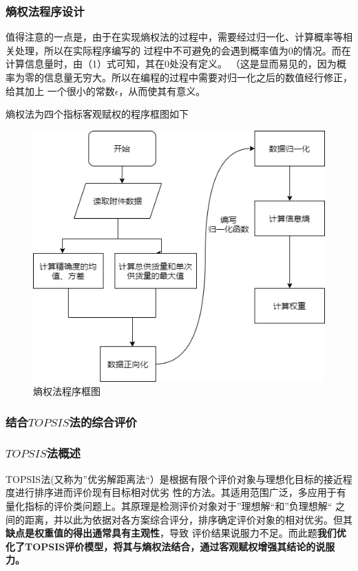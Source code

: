\documentclass{cumcmthesis}
\begin{document}
\subsubsection*{熵权法程序设计}
值得注意的一点是，由于在实现熵权法的过程中，需要经过归一化、计算概率等相关处理，所以在实际程序编写的
过程中不可避免的会遇到概率值为0的情况。而在计算信息量时，由（1）式可知，其在0处没有定义。
（这是显而易见的，因为概率为零的信息量无穷大。所以在编程的过程中需要对归一化之后的数值经行修正，给其加上
一个很小的常数$\epsilon$\cite{黄鹏2015福建省土地生态安全AHP法和熵值法动态评价比较}，从而使其有意义。\par
熵权法为四个指标客观赋权的程序框图如下
\begin{figure}[H]
    \centering
    \includegraphics[scale=0.6]{shangquan.png}
    \caption{熵权法程序框图}     \label{fig:2}
\end{figure}
\subsubsection{结合$TOPSIS$法的综合评价}
\subsubsection*{$TOPSIS$法概述}
TOPSIS法(又称为”优劣解距离法“）是根据有限个评价对象与理想化目标的接近程度进行排序进而评价现有目标相对优劣
性的方法。其适用范围广泛，多应用于有量化指标的评价类问题上。其原理是检测评价对象对于”理想解“和”负理想解“
之间的距离，并以此为依据对各方案综合评分，排序确定评价对象的相对优劣。但其\textbf{缺点是权重值的得出通常具有主观性}，导致
评价结果说服力不足。而此题\textbf{我们优化了TOPSIS评价模型，将其与熵权法结合，通过客观赋权增强其结论的说服力。}
\end{document}

